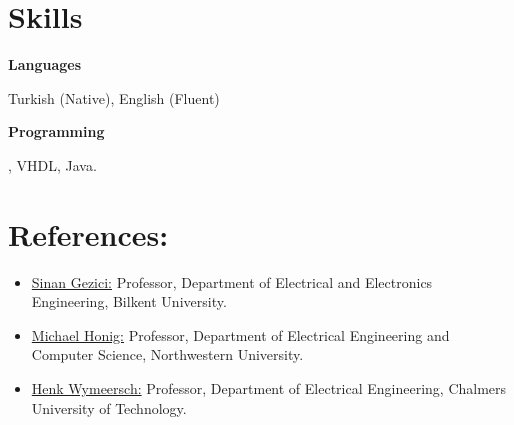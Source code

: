 \section{Skills}
\textbf{Languages}
\begin{innerlist}
    \item[] Turkish (Native), English (Fluent)
\end{innerlist}

\halfblankline

\textbf{Programming}
\begin{innerlist}
    \item[]  \Matlab, VHDL, Java.
\end{innerlist}

\section{References:} \begin{itemize}
	\item \href{http://www.ee.bilkent.edu.tr/~gezici/}{Sinan Gezici:} Professor, Department of Electrical and Electronics Engineering, Bilkent University.
	\item \href{http://www.eecs.northwestern.edu/~mh/}{Michael Honig:} Professor, Department of Electrical Engineering and Computer Science, Northwestern University.
	\item \href{https://sites.google.com/site/hwymeers/Home}{Henk Wymeersch:} Professor, Department of Electrical Engineering, Chalmers University of Technology.
\end{itemize}




